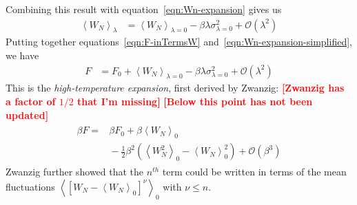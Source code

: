 \documentclass[letterpaper,twocolumn,amsmath,amssymb,prb]{revtex4-1}
\newcommand{\1}{\ensuremath{\textbf{r}_1}}
\newcommand{\2}{\ensuremath{\textbf{r}_2}}
\newcommand{\3}{\ensuremath{\textbf{r}_3}}
\newcommand{\4}{\ensuremath{\textbf{r}_4}}
\newcommand{\fixme}[1]{\textcolor{red}{\textbf{[#1]}}}
\begin{document}
Combining this result with equation~\ref{eqn:Wn-expansion} gives us
\begin{align}
  \left\langle W_N \right\rangle_\lambda &= \left\langle W_N\right\rangle_{\lambda = 0} - \beta\lambda\sigma_{\lambda=0}^2 + \mathcal{O}(\lambda^2) \label{eqn:Wn-expansion-simplified}
\end{align}
Putting together equations~\ref{eqn:F-inTermsW} and~\ref{eqn:Wn-expansion-simplified}, we have
\begin{align}
  F &= F_0 + \left\langle W_N \right\rangle_{\lambda=0} - \beta\lambda\sigma_{\lambda=0}^2 + \mathcal{O}(\lambda^2)
\end{align}
This is the \emph{high-temperature expansion}, first derived by
Zwanzig:\cite{Zwanzig54}
\fixme{Zwanzig has a factor of $1/2$ that I'm missing}
\fixme{Below this point has not been updated}
\begin{align}
  \begin{split}
    \beta F = &{} \beta F_0 + \beta\left\langle W_N \right\rangle_0  \\ &{} - \frac{1}{2}\beta^2\left( \left\langle W_N^2 \right\rangle_0 - \left\langle W_N \right\rangle_0^2 \right) + \mathcal{O}(\beta^3)
  \end{split}
\end{align}
Zwanzig further showed that the $n^{th}$ term could be written in terms of the mean fluctuations $\left\langle \left[ W_N - \left\langle W_N\right\rangle_0 \right]^\nu \right\rangle_0$ with $\nu \leq n$.
\end{document}
